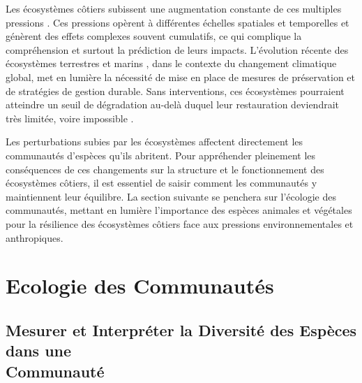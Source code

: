 \begin{refsection}
Les écosystèmes côtiers subissent une augmentation constante de ces
multiples pressions \autocite{ipbes_2019}. Ces pressions opèrent à
différentes échelles spatiales et temporelles et génèrent des effets
complexes souvent cumulatifs, ce qui complique la compréhension et
surtout la prédiction de leurs impacts. L'évolution récente des
écosystèmes terrestres et marins \autocite{Carmona_2021}, dans le
contexte du changement climatique global, met en lumière la nécessité de
mise en place de mesures de préservation et de stratégies de gestion
durable. Sans interventions, ces écosystèmes pourraient atteindre un
seuil de dégradation au-delà duquel leur restauration deviendrait très
limitée, voire impossible \autocite{Palmer_2020}.

Les perturbations subies par les écosystèmes affectent directement les
communautés d'espèces qu'ils abritent. Pour appréhender pleinement les
conséquences de ces changements sur la structure et le fonctionnement
des écosystèmes côtiers, il est essentiel de saisir comment les
communautés y maintiennent leur équilibre. La section suivante se
penchera sur l'écologie des communautés, mettant en lumière l'importance
des espèces animales et végétales pour la résilience des écosystèmes
côtiers face aux pressions environnementales et anthropiques.

\clearpage

\hypertarget{ecologie-des-communautuxe9s}{%
\section{Ecologie des Communautés}\label{ecologie-des-communautuxe9s}}

\hypertarget{mesurer-et-interpruxe9ter-la-diversituxe9-des-espuxe8ces-dans-une-communautuxe9}{%
\subsection{Mesurer et Interpréter la Diversité des Espèces dans une \\
Communauté}\label{mesurer-et-interpruxe9ter-la-diversituxe9-des-espuxe8ces-dans-une-communautuxe9}}


\end{refsection}
